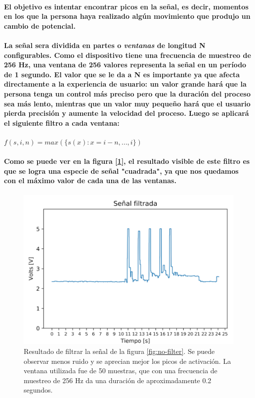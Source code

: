 \documentclass{article}
\begin{document}
\paragraph{
El objetivo es intentar encontrar picos en la señal, es decir, momentos en los que la persona haya realizado algún movimiento que produjo un cambio de potencial.
}
\paragraph{
La señal sera dividida en partes o \textit{ventanas} de longitud N configurables. Como el dispositivo tiene una frecuencia de muestreo de 256 Hz, una ventana de 256 valores representa la señal en un período de 1 segundo. El valor que se le da a N es importante ya que afecta directamente a la experiencia de usuario: un valor grande hará que la persona tenga un control más preciso pero que la duración del proceso sea más lento, mientras que un valor muy pequeño hará que el usuario pierda precisión y aumente la velocidad del proceso. Luego se aplicará el siguiente filtro a cada ventana:
}

\begin{center}
$f(s, i, n) = max(\big\{ s(x) : x = i - n, ..., i\big\})$
\end{center}

\paragraph{
Como se puede ver en la figura [\ref{fig:filtered}], el resultado visible de este filtro es que se logra una especie de señal "cuadrada", ya que nos quedamos con el máximo valor de cada una de las ventanas.
}

\begin{figure}[ht]
    \centering
    \includegraphics[width=\textwidth]{filtered.png}%
    \caption{Resultado de filtrar la señal de la figura \ref{fig:no-filter}. Se puede observar menos ruido y se aprecian mejor los picos de activación. La ventana utilizada fue de 50 muestras, que con una frecuencia de muestreo de 256 Hz da una duración de aproximadamente 0.2 segundos.}
    \label{fig:filtered}
\end{figure}
\end{document}
